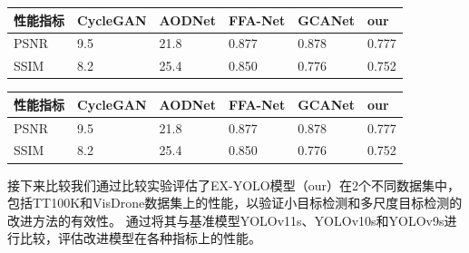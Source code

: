 \begin{table}[htbp]
    \centering
    \captionsetup{font=footnotesize}
    \label{tab:compare_studies_nyu2}
    \begin{tabular}{p{}p{}p{}p{}p{}p{}}
        \toprule
        性能指标 & CycleGAN & AODNet & FFA-Net & GCANet & our   \\ 
        \midrule
        PSNR    & 9.5      & 21.8   & 0.877   & 0.878  & 0.777 \\
        SSIM    & 8.2      & 25.4   & 0.850   & 0.776  & 0.752 \\
        \bottomrule
    \end{tabular}
\end{table}

\begin{table}[htbp]
    \centering
    \captionsetup{font=footnotesize}
    \label{tab:compare_studies_dh}
    \begin{tabular}{p{}p{}p{}p{}p{}p{}}
        \toprule
        性能指标 & CycleGAN & AODNet & FFA-Net & GCANet & our   \\ 
        \midrule
        PSNR    & 9.5      & 21.8   & 0.877   & 0.878  & 0.777 \\
        SSIM    & 8.2      & 25.4   & 0.850   & 0.776  & 0.752 \\
        \bottomrule
    \end{tabular}
\end{table}


接下来比较我们通过比较实验评估了EX-YOLO模型（our）在2个不同数据集中，包括TT100K和VisDrone数据集上的性能，以验证小目标检测和多尺度目标检测的改进方法的有效性。
通过将其与基准模型YOLOv11s、YOLOv10s和YOLOv9s进行比较，评估改进模型在各种指标上的性能。

